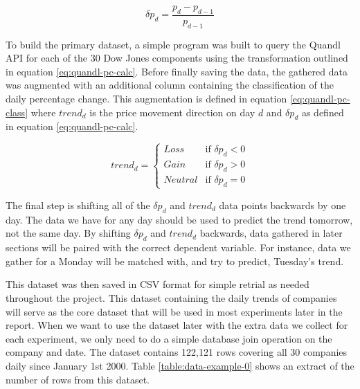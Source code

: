 \documentclass{report}
\begin{document}
\begin{figure}[H]
\begin{center}
    \begin{equation}
      \delta p_{d} = \dfrac{p_{d} - p_{d-1}} {p_{d-1}}
      \label{eq:quandl-pc-calc}
    \end{equation}
\end{center}
\end{figure}

To build the primary dataset, a simple program was built to query the Quandl API for each of the 30 Dow Jones components using the transformation outlined in equation \ref{eq:quandl-pc-calc}. Before finally saving the data, the gathered data was augmented with an additional column containing the classification of the daily percentage change. This augmentation is defined in equation \ref{eq:quandl-pc-class} where $trend_{d}$ is the price movement direction on day $d$ and $\delta p_{d}$ as defined in equation \ref{eq:quandl-pc-calc}.

\begin{figure}[H]
\begin{center}
\begin{equation}
trend_{d} = \begin{cases}
Loss &\text{if $\delta p_{d} < 0$}\\
Gain &\text{if $\delta p_{d} > 0$}\\
Neutral &\text{if $\delta p_{d} = 0$}
\end{cases}
\label{eq:quandl-pc-class}
\end{equation}
\end{center}
\end{figure}

The final step is shifting all of the $\delta p_{d}$ and $trend_{d}$ data points backwards by one day. The data we have for any day should be used to predict the trend tomorrow, not the same day. By shifting $\delta p_{d}$ and $trend_{d}$ backwards, data gathered in later sections will be paired with the correct dependent variable. For instance, data we gather for a Monday will be matched with, and try to predict, Tuesday's trend.

This dataset was then saved in CSV format for simple retrial as needed throughout the project. This dataset containing the daily trends of companies will serve as the core dataset that will be used in most experiments later in the report. When we want to use the dataset later with the extra data we collect for each experiment, we only need to do a simple database join operation on the company and date. The dataset contains 122,121 rows covering all 30 companies daily since January 1st 2000. Table \ref{table:data-example-0} shows an extract of the number of rows from this dataset.
\end{document}
